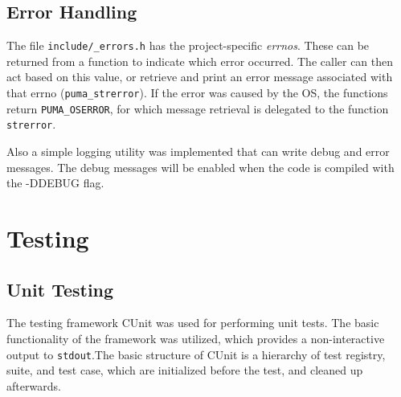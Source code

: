 \documentclass[12pt,a4paper]{article}
\begin{document}
\subsection{Error Handling}

The file \texttt{include/\_errors.h} has the project-specific \emph{errnos}. These can be returned from a function to indicate which error occurred. The caller can then act based on this value, or retrieve and print an error message associated with that errno (\texttt{puma\_strerror}). If the error was caused by the OS, the functions return \texttt{PUMA\_OSERROR}, for which message retrieval is delegated to the function \texttt{strerror}.

Also a simple logging utility was implemented that can write debug and error messages. The debug messages will be enabled when the code is compiled with the -DDEBUG flag.






\section{Testing}

\subsection{Unit Testing}


The testing framework CUnit was used for performing unit tests. The basic functionality of the framework was utilized, which provides a non-interactive output to \texttt{stdout}.The basic structure of CUnit is a hierarchy of test registry, suite, and test case, which are initialized before the test, and cleaned up afterwards.
\end{document}
